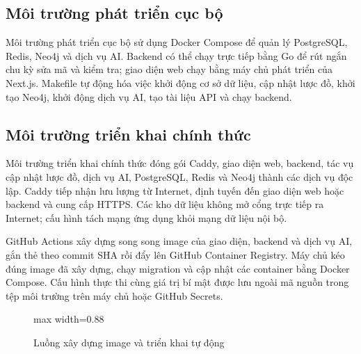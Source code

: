 \subsection{Môi trường phát triển cục bộ}

Môi trường phát triển cục bộ sử dụng Docker Compose để quản lý PostgreSQL, Redis, Neo4j và dịch vụ AI. Backend có thể chạy trực tiếp bằng Go để rút ngắn chu kỳ sửa mã và kiểm tra; giao diện web chạy bằng máy chủ phát triển của Next.js. Makefile tự động hóa việc khởi động cơ sở dữ liệu, cập nhật lược đồ, khởi tạo Neo4j, khởi động dịch vụ AI, tạo tài liệu API và chạy backend.

\subsection{Môi trường triển khai chính thức}

Môi trường triển khai chính thức đóng gói Caddy, giao diện web, backend, tác vụ cập nhật lược đồ, dịch vụ AI, PostgreSQL, Redis và Neo4j thành các dịch vụ độc lập. Caddy tiếp nhận lưu lượng từ Internet, định tuyến đến giao diện web hoặc backend và cung cấp HTTPS. Các kho dữ liệu không mở cổng trực tiếp ra Internet; cấu hình tách mạng ứng dụng khỏi mạng dữ liệu nội bộ.

GitHub Actions xây dựng song song image của giao diện, backend và dịch vụ AI, gắn thẻ theo commit SHA rồi đẩy lên GitHub Container Registry. Máy chủ kéo đúng image đã xây dựng, chạy migration và cập nhật các container bằng Docker Compose. Cấu hình thực thi cùng giá trị bí mật được lưu ngoài mã nguồn trong tệp môi trường trên máy chủ hoặc GitHub Secrets.

\begin{figure}[H]
\centering
\begin{adjustbox}{max width=0.88\textwidth}
\end{adjustbox}
\caption{Luồng xây dựng image và triển khai tự động}
\label{fig:ch3-demo-cicd}
\end{figure}

